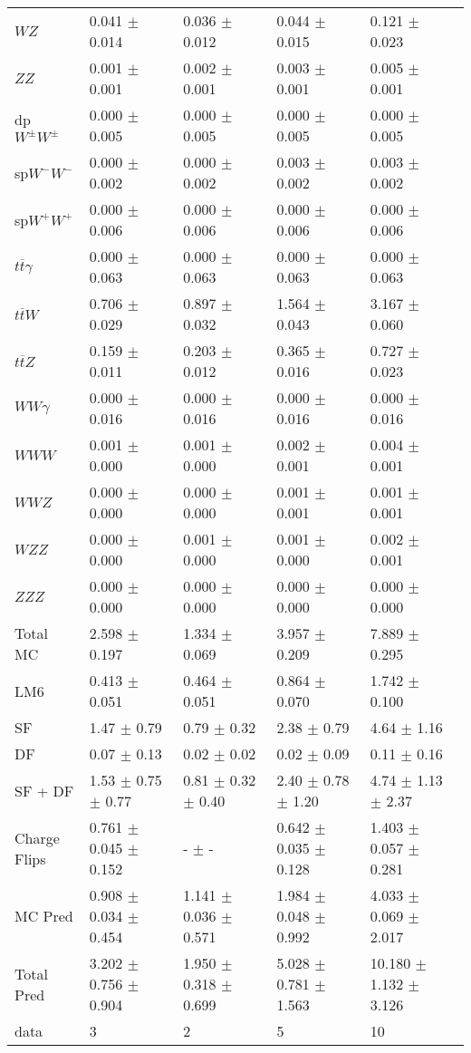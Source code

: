 \begin{tabular}{l | l l l l}
$WZ$ &  0.041 $\pm$  0.014 &  0.036 $\pm$  0.012 &  0.044 $\pm$  0.015 &  0.121 $\pm$  0.023\\
$ZZ$ &  0.001 $\pm$  0.001 &  0.002 $\pm$  0.001 &  0.003 $\pm$  0.001 &  0.005 $\pm$  0.001\\
\hline
dp$W^{\pm}W^{\pm}$ &  0.000 $\pm$  0.005 &  0.000 $\pm$  0.005 &  0.000 $\pm$  0.005 &  0.000 $\pm$  0.005\\
sp$W^{-}W^{-}$ &  0.000 $\pm$  0.002 &  0.000 $\pm$  0.002 &  0.003 $\pm$  0.002 &  0.003 $\pm$  0.002\\
sp$W^{+}W^{+}$ &  0.000 $\pm$  0.006 &  0.000 $\pm$  0.006 &  0.000 $\pm$  0.006 &  0.000 $\pm$  0.006\\
$t\overline{t}\gamma$ &  0.000 $\pm$  0.063 &  0.000 $\pm$  0.063 &  0.000 $\pm$  0.063 &  0.000 $\pm$  0.063\\
$t\overline{t}W$ &  0.706 $\pm$  0.029 &  0.897 $\pm$  0.032 &  1.564 $\pm$  0.043 &  3.167 $\pm$  0.060\\
$t\overline{t}Z$ &  0.159 $\pm$  0.011 &  0.203 $\pm$  0.012 &  0.365 $\pm$  0.016 &  0.727 $\pm$  0.023\\
$WW\gamma$ &  0.000 $\pm$  0.016 &  0.000 $\pm$  0.016 &  0.000 $\pm$  0.016 &  0.000 $\pm$  0.016\\
$WWW$ &  0.001 $\pm$   0.000 &  0.001 $\pm$   0.000 &  0.002 $\pm$  0.001 &  0.004 $\pm$  0.001\\
$WWZ$ &   0.000 $\pm$   0.000 &   0.000 $\pm$   0.000 &  0.001 $\pm$  0.001 &  0.001 $\pm$  0.001\\
$WZZ$ &   0.000 $\pm$   0.000 &  0.001 $\pm$   0.000 &  0.001 $\pm$   0.000 &  0.002 $\pm$  0.001\\
$ZZZ$ &   0.000 $\pm$   0.000 &   0.000 $\pm$   0.000 &   0.000 $\pm$   0.000 &   0.000 $\pm$   0.000\\
\hline
Total MC &  2.598 $\pm$  0.197 &  1.334 $\pm$  0.069 &  3.957 $\pm$  0.209 &  7.889 $\pm$  0.295\\
\hline\hline
\hline
LM6 &  0.413 $\pm$  0.051 &  0.464 $\pm$  0.051 &  0.864 $\pm$  0.070 &  1.742 $\pm$  0.100\\
\hline\hline
\hline\hline
 SF  & 1.47 $\pm$ 0.79 & 0.79 $\pm$ 0.32 & 2.38 $\pm$ 0.79 & 4.64 $\pm$ 1.16\\
 DF  & 0.07 $\pm$ 0.13 & 0.02 $\pm$ 0.02 & 0.02 $\pm$ 0.09 & 0.11 $\pm$ 0.16\\
\hline
 SF + DF  & 1.53 $\pm$ 0.75 $\pm$ 0.77 & 0.81 $\pm$ 0.32 $\pm$ 0.40 & 2.40 $\pm$ 0.78 $\pm$ 1.20 & 4.74 $\pm$ 1.13 $\pm$ 2.37\\
\hline\hline
Charge Flips & 0.761 $\pm$ 0.045 $\pm$ 0.152 & - $\pm$ - & 0.642 $\pm$ 0.035 $\pm$ 0.128 & 1.403 $\pm$ 0.057 $\pm$ 0.281\\
\hline\hline
\hline
MC Pred &  0.908 $\pm$  0.034 $\pm$  0.454 &  1.141 $\pm$  0.036 $\pm$  0.571 &  1.984 $\pm$  0.048 $\pm$  0.992 &  4.033 $\pm$  0.069 $\pm$  2.017\\
\hline\hline
Total Pred &  3.202 $\pm$  0.756 $\pm$  0.904 &  1.950 $\pm$  0.318 $\pm$  0.699 &  5.028 $\pm$  0.781 $\pm$  1.563 & 10.180 $\pm$  1.132 $\pm$  3.126\\
\hline\hline
data & 3 & 2 & 5 & 10\\
\hline\hline
\end{tabular}
